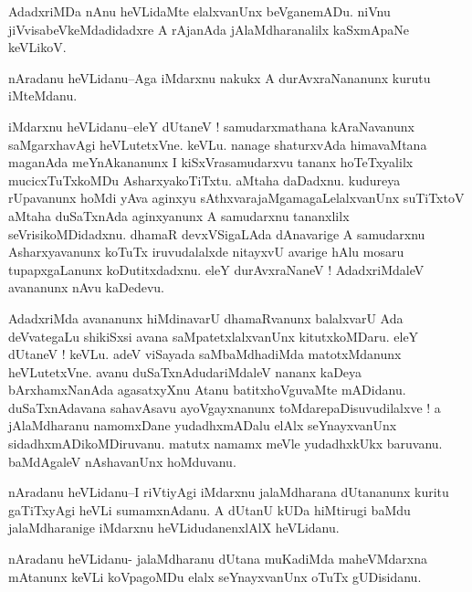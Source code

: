 \documentclass{article}
\begin{document}
\begin{mn}%
AdadxriMDa nAnu heVLidaMte elalxvanUnx beVganemADu. niVnu jiVvisabeVkeMdadidadxre A rAjanAda 
jAlaMdharanalilx kaSxmApaNe keVLikoV.
\end{mn}

\begin{mn}%
nAradanu heVLidanu--Aga iMdarxnu nakukx A durAvxraNananunx kurutu iMteMdanu.
\end{mn}

\begin{mn}%
iMdarxnu heVLidanu--eleY dUtaneV ! samudarxmathana kAraNavanunx saMgarxhavAgi heVLutetxVne. 
keVLu. nanage shaturxvAda himavaMtana maganAda meYnAkananunx I kiSxVrasamudarxvu tananx 
hoTeTxyalilx mucicxTuTxkoMDu AsharxyakoTiTxtu. aMtaha daDadxnu. kudureya rUpavanunx hoMdi 
yAva aginxyu sAthxvarajaMgamagaLelalxvanUnx suTiTxtoV aMtaha duSaTxnAda aginxyanunx A 
samudarxnu tananxlilx seVrisikoMDidadxnu. dhamaR devxVSigaLAda dAnavarige A samudarxnu 
Asharxyavanunx koTuTx iruvudalalxde nitayxvU avarige hAlu mosaru tupapxgaLanunx 
koDutitxdadxnu. eleY durAvxraNaneV ! AdadxriMdaleV avananunx nAvu kaDedevu.
\end{mn}

\begin{mn}%
AdadxriMda avananunx hiMdinavarU dhamaRvanunx balalxvarU Ada deVvategaLu shikiSxsi avana 
saMpatetxlalxvanUnx kitutxkoMDaru. eleY dUtaneV ! keVLu. adeV viSayada saMbaMdhadiMda 
matotxMdanunx heVLutetxVne. avanu duSaTxnAdudariMdaleV nananx kaDeya bArxhamxNanAda 
agasatxyXnu Atanu batitxhoVguvaMte mADidanu. duSaTxnAdavana sahavAsavu ayoVgayxnanunx 
toMdarepaDisuvudilalxve ! a jAlaMdharanu namomxDane yudadhxmADalu elAlx seYnayxvanUnx 
sidadhxmADikoMDiruvanu. matutx namamx meVle yudadhxkUkx baruvanu. baMdAgaleV nAshavanUnx 
hoMduvanu.
\end{mn}

\begin{mn}%
nAradanu heVLidanu--I riVtiyAgi iMdarxnu jalaMdharana dUtananunx kuritu gaTiTxyAgi heVLi 
sumamxnAdanu. A dUtanU kUDa hiMtirugi baMdu jalaMdharanige iMdarxnu heVLidudanenxlAlX 
heVLidanu.
\end{mn}


\begin{mn}%
nAradanu heVLidanu- jalaMdharanu dUtana muKadiMda maheVMdarxna mAtanunx keVLi koVpagoMDu 
elalx seYnayxvanUnx oTuTx gUDisidanu.
\end{mn}
\end{document}
